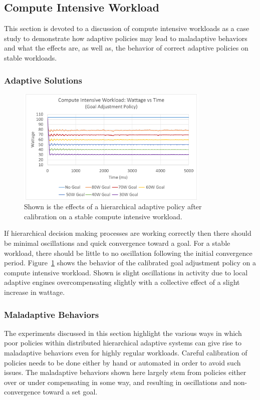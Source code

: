    \subsection{Compute Intensive Workload}
        This section is devoted to a discussion of compute intensive workloads as a case study to demonstrate how adaptive policies may lead to maladaptive behaviors and what the effects are, as well as, the behavior of correct adaptive policies on stable workloads.

        \subsubsection{Adaptive Solutions}
            \begin{figure}[htb!]
                \centering
                \includegraphics[width=0.82\textwidth]{Fig/compute_graph.pdf}
                \caption[Compute Intensive Workload Using an Adaptive Goal Adjustment Policy with Calibrated Rates (Watts vs Time)]{Shown is the effects of a hierarchical adaptive policy after calibration on a stable compute intensive workload.}
                \label{fig:compute_graph}
            \end{figure}

            If hierarchical decision making processes are working correctly then there should be minimal oscillations and quick convergence toward a goal. For a stable workload, there should be little to no oscillation following the initial convergence period. Figure~\ref{fig:compute_graph} shows the behavior of the calibrated goal adjustment policy on a compute intensive workload. Shown is slight oscillations in activity due to local adaptive engines overcompensating slightly with a collective effect of a slight increase in wattage.

        \subsubsection{Maladaptive Behaviors}
            The experiments discussed in this section highlight the various ways in which poor policies within distributed hierarchical adaptive systems can give rise to maladaptive behaviors even for highly regular workloads. Careful calibration of policies needs to be done either by hand or automated in order to avoid such issues. The maladaptive behaviors shown here largely stem from policies either over or under compensating in some way, and resulting in oscillations and non-convergence toward a set goal.

